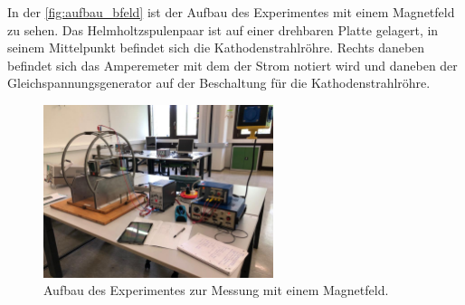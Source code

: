     \noindent In der \autoref{fig:aufbau_bfeld} ist der Aufbau des Experimentes mit einem Magnetfeld zu sehen. Das Helmholtzspulenpaar ist auf einer drehbaren
    Platte gelagert, in seinem Mittelpunkt befindet sich die Kathodenstrahlröhre. Rechts daneben befindet sich das Amperemeter mit dem der Strom notiert wird und 
    daneben der Gleichspannungsgenerator auf der Beschaltung für die Kathodenstrahlröhre. 

    \begin{figure}[H]
        \centering
        \includegraphics[width=0.6\textwidth]{bilder/foto_magnet.jpeg}
        \caption{Aufbau des Experimentes zur Messung mit einem Magnetfeld.}
        \label{fig:aufbau_bfeld}
    \end{figure} 


